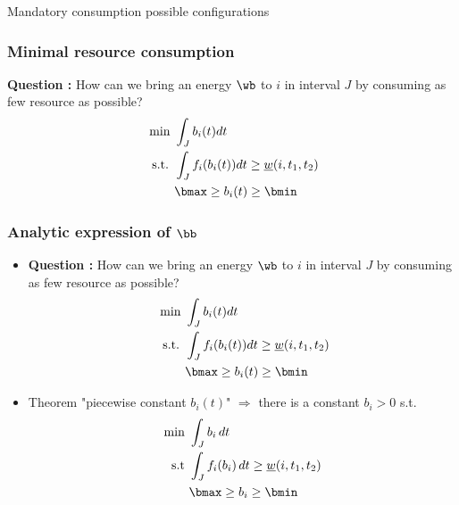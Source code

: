 \begin{frame}{Mandatory consumption possible configurations}
  
\end{frame}

\begin{frame}
  \frametitle{Minimal resource consumption}
  \begin{center}
    
  \end{center}
  \vfill
\pause
  \textbf{Question : }
  How can we bring an energy $\wb$ to $i$ in interval $J$ by consuming
  as few resource as possible? 
  \vfill
\pause
  \begin{align*}
    \text{ min }& \int_{J} b_i(t)dt  \\
    \text{ s.t. } & \int_{J}f_i(b_i(t))dt \ge  \underline{w}(i,t_1,t_2) \\
                &  \bmax \ge b_i(t) \ge \bmin
  \end{align*}
  \vfill
\end{frame}

\begin{frame}
  \frametitle{Analytic expression of $\bb$}
  \vfill
  \begin{itemize}
  \item  \textbf{Question : }
    How can we bring an energy $\wb$ to $i$ in interval $J$ by consuming as few resource as possible?
    \vfill
    \begin{align*}
      \text{ min }& \int_{J} b_i(t)dt  \\
      \text{ s.t. } & \int_{J}f_i(b_i(t))dt \ge  \underline{w}(i,t_1,t_2) \\
                  &  \bmax \ge b_i(t) \ge \bmin
    \end{align*}
    \vfill
\pause
\item Theorem "piecewise constant $b_i(t)$" $\Rightarrow$ there is a constant $b_{i} > 0 $
    s.t. 
\pause
    \begin{align*}
      \text{min }  & \int_{J} b_i\,dt  \\
      \text{s.t } & \int_{J}f_i(b_i)\,dt \ge
                    \underline{w}(i,t_1,t_2)\\
                   & \bmax \ge b_i \ge \bmin
    \end{align*}
  \end{itemize}
  \vfill
\end{frame}

